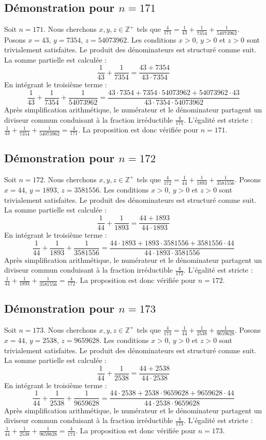 \documentclass[11pt,a4paper]{article}
\begin{document}
\subsection{Démonstration pour $n = 171$}
Soit $n = 171$. Nous cherchons $x, y, z \in \mathbb{Z}^{+}$ tels que $\frac{4}{171} = \frac{1}{43} + \frac{1}{7354} + \frac{1}{54073962}$.
Posons $x = 43$, $y = 7354$, $z = 54073962$.
Les conditions $x > 0$, $y > 0$ et $z > 0$ sont trivialement satisfaites.
Le produit des dénominateurs est structuré comme suit. La somme partielle est calculée :
$$ \frac{1}{43} + \frac{1}{7354} = \frac{43+7354}{43 \cdot 7354} $$
En intégrant le troisième terme :
$$ \frac{1}{43} + \frac{1}{7354} + \frac{1}{54073962} = \frac{43 \cdot 7354 + 7354 \cdot 54073962 + 54073962 \cdot 43}{43 \cdot 7354 \cdot 54073962} $$
Après simplification arithmétique, le numérateur et le dénominateur partagent un diviseur commun conduisant à la fraction irréductible $\frac{4}{171}$.
L'égalité est stricte : $\frac{1}{43} + \frac{1}{7354} + \frac{1}{54073962} = \frac{4}{171}$.
La proposition est donc vérifiée pour $n = 171$.
\subsection{Démonstration pour $n = 172$}
Soit $n = 172$. Nous cherchons $x, y, z \in \mathbb{Z}^{+}$ tels que $\frac{4}{172} = \frac{1}{44} + \frac{1}{1893} + \frac{1}{3581556}$.
Posons $x = 44$, $y = 1893$, $z = 3581556$.
Les conditions $x > 0$, $y > 0$ et $z > 0$ sont trivialement satisfaites.
Le produit des dénominateurs est structuré comme suit. La somme partielle est calculée :
$$ \frac{1}{44} + \frac{1}{1893} = \frac{44+1893}{44 \cdot 1893} $$
En intégrant le troisième terme :
$$ \frac{1}{44} + \frac{1}{1893} + \frac{1}{3581556} = \frac{44 \cdot 1893 + 1893 \cdot 3581556 + 3581556 \cdot 44}{44 \cdot 1893 \cdot 3581556} $$
Après simplification arithmétique, le numérateur et le dénominateur partagent un diviseur commun conduisant à la fraction irréductible $\frac{4}{172}$.
L'égalité est stricte : $\frac{1}{44} + \frac{1}{1893} + \frac{1}{3581556} = \frac{4}{172}$.
La proposition est donc vérifiée pour $n = 172$.
\subsection{Démonstration pour $n = 173$}
Soit $n = 173$. Nous cherchons $x, y, z \in \mathbb{Z}^{+}$ tels que $\frac{4}{173} = \frac{1}{44} + \frac{1}{2538} + \frac{1}{9659628}$.
Posons $x = 44$, $y = 2538$, $z = 9659628$.
Les conditions $x > 0$, $y > 0$ et $z > 0$ sont trivialement satisfaites.
Le produit des dénominateurs est structuré comme suit. La somme partielle est calculée :
$$ \frac{1}{44} + \frac{1}{2538} = \frac{44+2538}{44 \cdot 2538} $$
En intégrant le troisième terme :
$$ \frac{1}{44} + \frac{1}{2538} + \frac{1}{9659628} = \frac{44 \cdot 2538 + 2538 \cdot 9659628 + 9659628 \cdot 44}{44 \cdot 2538 \cdot 9659628} $$
Après simplification arithmétique, le numérateur et le dénominateur partagent un diviseur commun conduisant à la fraction irréductible $\frac{4}{173}$.
L'égalité est stricte : $\frac{1}{44} + \frac{1}{2538} + \frac{1}{9659628} = \frac{4}{173}$.
La proposition est donc vérifiée pour $n = 173$.
\end{document}
